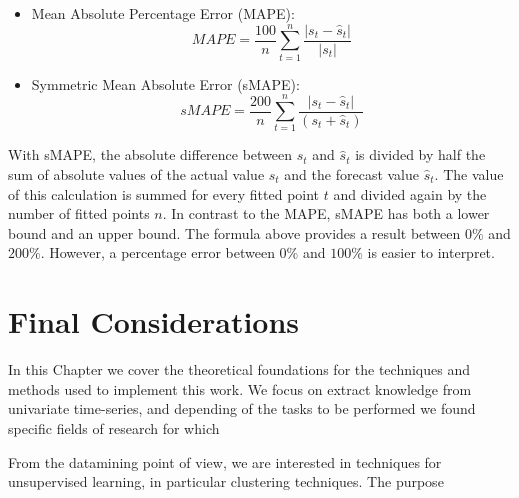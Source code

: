 \begin{itemize}	
	\item Mean Absolute Percentage Error (MAPE):
	\begin{equation}
	MAPE = \frac{100}{n}\sum_{t=1}^{n} \frac{\left|s_t - \hat{s}_t\right|}{|s_t|}
	\end{equation}	
	\item Symmetric Mean Absolute Error (sMAPE):	
	\begin{equation}
	sMAPE = \frac{200}{n}\sum_{t=1}^{n} \frac{\left|s_t - \hat{s}_t\right|}{\left(s_{t}+\hat{s}_{t}\right)}
	\end{equation}	
\end{itemize}

With sMAPE, the absolute difference between $s_{t}$ and $\hat{s}_{t}$ is divided by half the sum of absolute values of the actual value $s_{t}$ and the forecast value $\hat{s}_{t}$. The value of this calculation is summed for every fitted point $t$ and divided again by the number of fitted points $n$. In contrast to the MAPE, sMAPE has both a lower bound and an upper bound. The formula above provides a result between $0\%$ and $200\%$. However, a percentage error between $0\%$ and $100\%$ is easier to interpret.  

\section{Final Considerations}
\label{Sec:TheoFinalConsiderations}

In this Chapter we cover the theoretical foundations for the techniques and methods used to implement this work. We focus on extract knowledge from univariate time-series, and depending of the tasks to be performed we found specific fields of research for which 

From the datamining point of view, we are interested in techniques for unsupervised learning, in particular clustering techniques. The purpose 

